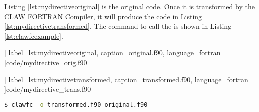 Listing \ref{lst:mydirectiveoriginal} is the original code. Once it is
transformed by the CLAW FORTRAN Compiler, it will produce the code
in Listing \ref{lst:mydirectivetransformed}. The command to call
the \clawfcomp is shown in Listing \ref{lst:clawfcexample}.


  [
    label=lst:mydirectiveoriginal,
    caption=original.f90,
    language=fortran
  ]{code/mydirective_orig.f90}


  [
    label=lst:mydirectivetransformed,
    caption=transformed.f90,
    language=fortran
  ]{code/mydirective_trans.f90}

\begin{lstlisting}[label=lst:clawfcexample, caption=Call the compiler, language=bash]
$ clawfc -o transformed.f90 original.f90
\end{lstlisting}
